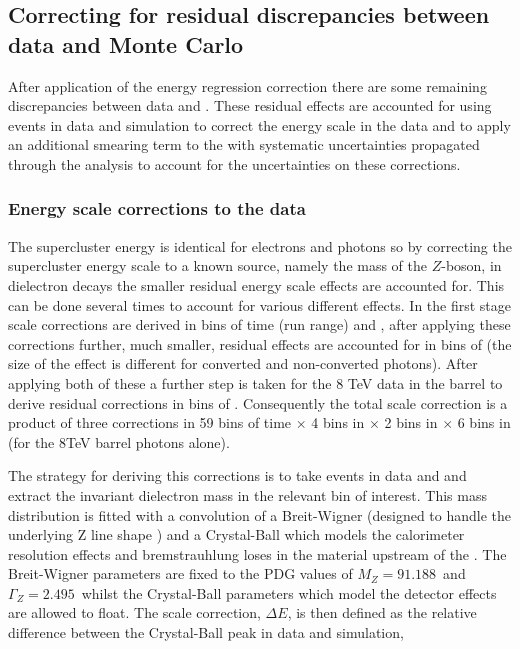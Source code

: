 \subsection{Correcting for residual discrepancies between data and Monte Carlo}

After application of the energy regression correction there are some remaining discrepancies between data and \MC. These residual effects are accounted for using \Zee events in data and simulation to correct the energy scale in the data and to apply an additional smearing term to the \MC with systematic uncertainties propagated through the analysis to account for the uncertainties on these corrections.

\subsubsection{Energy scale corrections to the data}

The supercluster energy is identical for electrons and photons so by correcting the supercluster energy scale to a known source, namely the mass of the $Z$-boson, in dielectron decays the smaller residual energy scale effects are accounted for. This can be done several times to account for various different effects. In the first stage scale corrections are derived in bins of time (run range) and \eta, after applying these corrections further, much smaller, residual effects are accounted for in bins of \rnine (the size of the effect is different for converted and non-converted photons). After applying both of these a further step is taken for the 8 TeV data in the barrel to derive residual corrections in bins of \ET. Consequently the total scale correction is a product of three corrections in 59 bins of time $\times$ 4 bins in \eta $\times$ 2 bins in \rnine $\times$ 6 bins in \ET (for the 8TeV barrel photons alone).

The strategy for deriving this corrections is to take \Zee events in data and \MC and extract the invariant dielectron mass in the relevant bin of interest. This mass distribution is fitted with a convolution of a Breit-Wigner (designed to handle the underlying Z line shape ) and a Crystal-Ball which models the calorimeter resolution effects and bremstrauhlung loses in the material upstream of the \ECAL. The Breit-Wigner parameters are fixed to the PDG values of $M_{Z}=91.188$~\GeV and $\Gamma_{Z}=2.495$~\GeV {} whilst the Crystal-Ball parameters which model the detector effects are allowed to float. The scale correction, $\Delta E$, is then defined as the relative difference between the Crystal-Ball peak in data and simulation,

